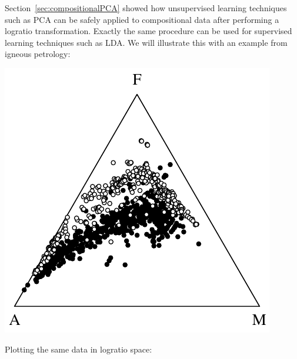 Section~\ref{sec:compositionalPCA} showed how unsupervised learning
techniques such as PCA can be safely applied to compositional data
after performing a logratio transformation. Exactly the same procedure
can be used for supervised learning techniques such as LDA. We will
illustrate this with an example from igneous petrology:

\noindent\begin{minipage}[t][][b]{.35\textwidth}
\includegraphics[width=\textwidth]{../figures/AFM.pdf}\medskip
\end{minipage}
\begin{minipage}[t][][t]{.65\textwidth}
  \label{fig:AFM}
\end{minipage}

Plotting the same data in logratio space:

